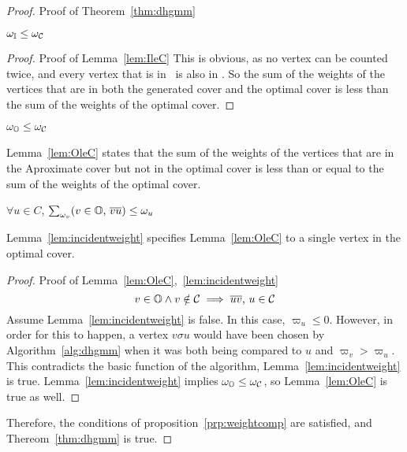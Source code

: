 \begin{proof}{Proof of Theorem~\ref{thm:dhgmm}}
  \begin{lem}
    $\omega_{{\mathbb I}} \le \omega_{{\mathcal C}}$
    \label{lem:IleC}
  \end{lem}
  \begin{proof}{Proof of Lemma~\ref{lem:IleC}}
    This is obvious, as no vertex can be counted twice, and every vertex that is in \bId\ is also in \cCd. So the sum of the weights of the vertices that are in both the generated cover and the optimal cover is less than the sum of the weights of the optimal cover.
  \end{proof}
  \begin{lem}
    $\omega_{{\mathbb O}} \le \omega_{{\mathcal C}}$
    \label{lem:OleC}
  \end{lem}
  \begin{note}
    Lemma~\ref{lem:OleC} states that the sum of the weights of the vertices that are in the Aproximate cover but not in the optimal cover is less than or equal to the sum of the weights of the optimal cover.
  \end{note}
  \begin{lem}
    $\forall u \in C$, $\sum_{\omega_v} (v \in {\mathbb O}\text{, }\overline{vu}) \le \omega_u$
    \label{lem:incidentweight}
  \end{lem}
  \begin{note}
    Lemma~\ref{lem:incidentweight} specifies Lemma~\ref{lem:OleC} to a single vertex in the optimal cover. 
  \end{note} 
  \begin{proof}{Proof of Lemma~\ref{lem:OleC},~\ref{lem:incidentweight}}
    \begin{equation}
      v \in {\mathbb O} \land v \notin {\mathcal C} \implies \overline{uv} \text{, } u \in {\mathcal C}
    \end{equation}
    Assume Lemma~\ref{lem:incidentweight} is false. In this case, $\varpi_u \le 0$. However, in order for this to happen, a vertex $v\sigma u$ would have been chosen by Algorithm~\ref{alg:dhgmm} when it was both being compared to $u$ and $\varpi_v > \varpi_u$. This contradicts the basic function of the algorithm, Lemma~\ref{lem:incidentweight} is true.
    Lemma~\ref{lem:incidentweight} implies $\omega_{{\mathbb O}} \le \omega_{{\mathcal C}}$, so Lemma~\ref{lem:OleC} is true as well.
  \end{proof}
        
  Therefore, the conditions of proposition~\ref{prp:weightcomp} are satisfied, and Thereom~\ref{thm:dhgmm} is true.
\end{proof}
